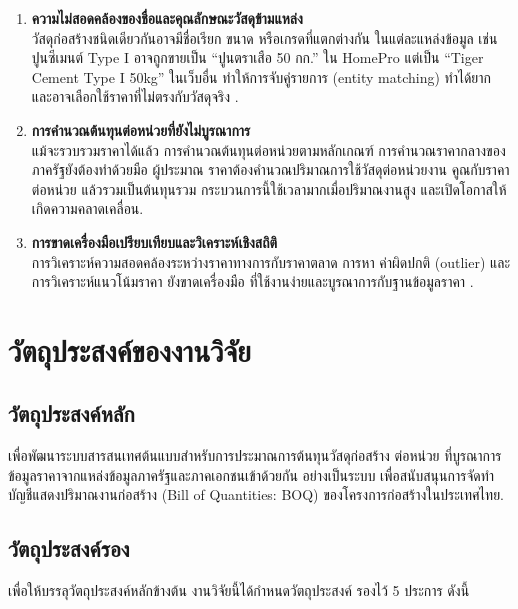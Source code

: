 \begin{enumerate}[leftmargin=2em,itemsep=0.4em]
  \item \textbf{ความไม่สอดคล้องของชื่อและคุณลักษณะวัสดุข้ามแหล่ง}\\
        วัสดุก่อสร้างชนิดเดียวกันอาจมีชื่อเรียก ขนาด หรือเกรดที่แตกต่างกัน
        ในแต่ละแหล่งข้อมูล เช่น ปูนซีเมนต์ Type I อาจถูกขายเป็น
        ``ปูนตราเสือ 50 กก.'' ใน HomePro แต่เป็น ``Tiger Cement Type I 50kg''
        ในเว็บอื่น ทำให้การจับคู่รายการ (entity matching) ทำได้ยาก
        และอาจเลือกใช้ราคาที่ไม่ตรงกับวัสดุจริง \cite{chunyaem2019}.

  \item \textbf{การคำนวณต้นทุนต่อหน่วยที่ยังไม่บูรณาการ}\\
        แม้จะรวบรวมราคาได้แล้ว การคำนวณต้นทุนต่อหน่วยตามหลักเกณฑ์
        การคำนวณราคากลางของภาครัฐยังต้องทำด้วยมือ \cite{cgd2569} ผู้ประมาณ
        ราคาต้องคำนวณปริมาณการใช้วัสดุต่อหน่วยงาน คูณกับราคาต่อหน่วย
        แล้วรวมเป็นต้นทุนรวม กระบวนการนี้ใช้เวลามากเมื่อปริมาณงานสูง
        และเปิดโอกาสให้เกิดความคลาดเคลื่อน.

  \item \textbf{การขาดเครื่องมือเปรียบเทียบและวิเคราะห์เชิงสถิติ}\\
        การวิเคราะห์ความสอดคล้องระหว่างราคาทางการกับราคาตลาด การหา
        ค่าผิดปกติ (outlier) และการวิเคราะห์แนวโน้มราคา ยังขาดเครื่องมือ
        ที่ใช้งานง่ายและบูรณาการกับฐานข้อมูลราคา \cite{lee2024,liu2024}.
\end{enumerate}

\section{วัตถุประสงค์ของงานวิจัย}
\label{sec:objectives}

\subsection{วัตถุประสงค์หลัก}
\label{sec:obj-main}

เพื่อพัฒนาระบบสารสนเทศต้นแบบสำหรับการประมาณการต้นทุนวัสดุก่อสร้าง
ต่อหน่วย ที่บูรณาการข้อมูลราคาจากแหล่งข้อมูลภาครัฐและภาคเอกชนเข้าด้วยกัน
อย่างเป็นระบบ เพื่อสนับสนุนการจัดทำบัญชีแสดงปริมาณงานก่อสร้าง (Bill
of Quantities: BOQ) ของโครงการก่อสร้างในประเทศไทย.

\subsection{วัตถุประสงค์รอง}
\label{sec:obj-sub}

เพื่อให้บรรลุวัตถุประสงค์หลักข้างต้น งานวิจัยนี้ได้กำหนดวัตถุประสงค์
รองไว้ 5 ประการ ดังนี้

